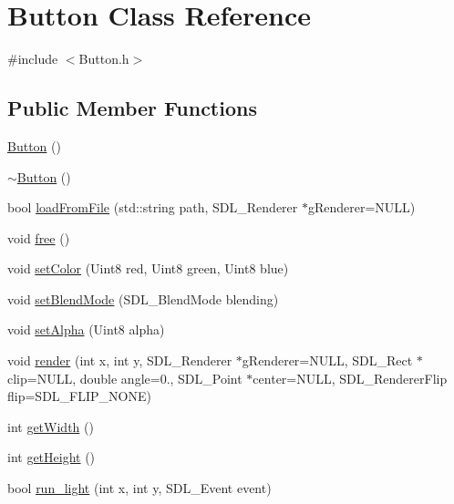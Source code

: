 \hypertarget{class_button}{}\section{Button Class Reference}
\label{class_button}


{\ttfamily \#include $<$Button.\+h$>$}

\subsection*{Public Member Functions}
\begin{DoxyCompactItemize}
\item 
\mbox{\hyperlink{class_button_a3b36df1ae23c58aedb9e15a713159459}{Button}} ()
\item 
\mbox{\hyperlink{class_button_a2a001eb9c3cc8ae54768a850dd345002}{$\sim$\+Button}} ()
\item 
bool \mbox{\hyperlink{class_button_aec798706951af6d664a7c88e83b59b73}{load\+From\+File}} (std\+::string path, S\+D\+L\+\_\+\+Renderer $\ast$g\+Renderer=N\+U\+LL)
\item 
void \mbox{\hyperlink{class_button_ab31b0993b959cf9863eb2cf22a7ae18b}{free}} ()
\item 
void \mbox{\hyperlink{class_button_a353eabb5dcb11670e8ce1094f3ba77b4}{set\+Color}} (Uint8 red, Uint8 green, Uint8 blue)
\item 
void \mbox{\hyperlink{class_button_a6abacb86ed21f8d06dca634a8ff9bde2}{set\+Blend\+Mode}} (S\+D\+L\+\_\+\+Blend\+Mode blending)
\item 
void \mbox{\hyperlink{class_button_aa2fa8986d2d5c2e44d8c17373863a5fa}{set\+Alpha}} (Uint8 alpha)
\item 
void \mbox{\hyperlink{class_button_a0d2179449697d361c97e533c839a87d0}{render}} (int x, int y, S\+D\+L\+\_\+\+Renderer $\ast$g\+Renderer=N\+U\+LL, S\+D\+L\+\_\+\+Rect $\ast$clip=N\+U\+LL, double angle=0., S\+D\+L\+\_\+\+Point $\ast$center=N\+U\+LL, S\+D\+L\+\_\+\+Renderer\+Flip flip=S\+D\+L\+\_\+\+F\+L\+I\+P\+\_\+\+N\+O\+NE)
\item 
int \mbox{\hyperlink{class_button_a78bb3e6eeb85f91d07c98b392a816f3f}{get\+Width}} ()
\item 
int \mbox{\hyperlink{class_button_a9ed8c54a9a7f468ea3fa4417f954ec23}{get\+Height}} ()
\item 
bool \mbox{\hyperlink{class_button_aa8b6e2e47a230747970b641aa7d75de5}{run\+\_\+light}} (int x, int y, S\+D\+L\+\_\+\+Event event)
\end{DoxyCompactItemize}
